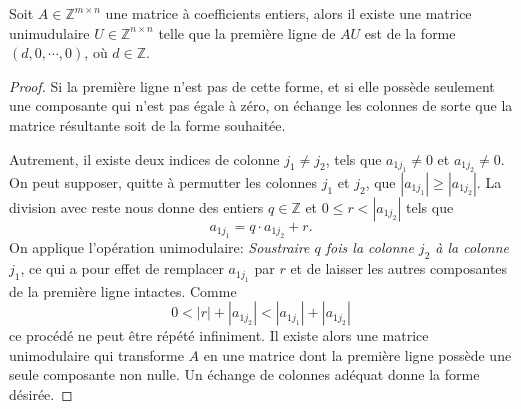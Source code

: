 \begin{lemma}
  \label{lem:24}
  Soit  $A ∈ℤ^{ m ×n}$ une matrice à coefficients entiers, alors il existe une matrice unimudulaire $U ∈ℤ^{ n ×n}$ telle que la première ligne de $AU$ est de la forme $(d,0,\cdots,0)$, où $d ∈ℤ$.
\end{lemma}

\begin{proof}

    Si la première ligne n'est pas de cette forme, et si elle possède seulement une
  composante qui n'est pas égale à zéro, on échange les colonnes de sorte que
  la matrice résultante soit de la forme souhaitée.
  
  Autrement, il existe deux indices de colonne $j_1\neq j_2$, tels
  que $a_{1j_1}\neq 0$ et $a_{1j_2} \neq 0$. On peut supposer, quitte à permutter les colonnes $j_1$ et $j_2$, que
  $|a_{1j_1}| ≥ |a_{1j_2}|$. La division avec reste nous donne des entiers $q ∈ℤ$ et
  $0 ≤r < |a_{1j_2}|$ tels que
  \begin{displaymath}
    a_{1j_1} = q ⋅ a_{1j_2} + r. 
  \end{displaymath}
  On applique l'opération unimodulaire: \emph{Soustraire $q$ fois la
    colonne $j_2$ à la colonne $j_1$}, ce qui a pour effet de remplacer $a_{1j_1}$ par $r$ et
   de laisser les autres composantes de la première ligne intactes. Comme
    \begin{displaymath}
      0 < |r|+ |a_{1j_2}|<  |a_{1j_{1}}|+ |a_{1j_2}|
    \end{displaymath}
    ce procédé ne peut être répété infiniment. Il existe alors une
    matrice unimodulaire qui transforme $A$ en une matrice dont la première
    ligne possède une seule composante non nulle. Un échange de
    colonnes adéquat donne la forme désirée.
  \end{proof}

